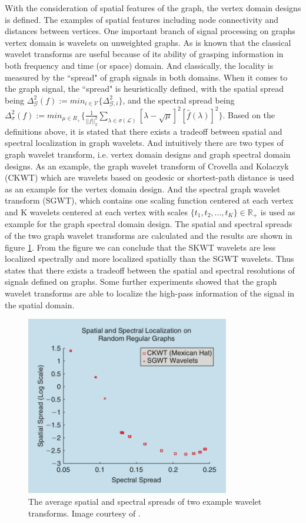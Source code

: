 \documentclass[conference]{IEEEtran}
\begin{document}
With the consideration of spatial features of the graph, the vertex domain designs is defined. The examples of spatial features including node connectivity and distances between vertices. One important branch of signal processing on graphs vertex domain is wavelets on unweighted graphs. As is known that the classical wavelet transforms are useful because of its ability of grasping information in both frequency and time (or space) domain. And classically, the locality is measured by the ``spread" of graph signals in both domains. When it comes to the graph signal, the ``spread" is heuristically defined, with the spatial spread being $\Delta_\mathcal{G}^2(f):=min_{i\in\mathcal{V}}\{\Delta_{\mathcal{G}, i}^2\}$, and the spectral spread being $\Delta_{\sigma}^2(f):=min_{\mu\in R_+}\{\displaystyle\frac{1}{||f||_2^2}\sum_{\lambda\in\sigma (\mathcal{L})}[\lambda-\sqrt{\mu}]^2[\hat{f}(\lambda)]^2\}$. Based on the definitions above, it is stated that there exists a tradeoff between spatial and spectral localization in graph wavelets. And intuitively there are two types of graph wavelet transform, i.e. vertex domain designs and graph spectral domain designs. As an example, the graph wavelet transform of Crovella and Kolaczyk (CKWT) which are wavelets based on geodesic or shortest-path distance is used as an example for the vertex domain design. And the spectral graph wavelet transform (SGWT), which contains one scaling function centered at each vertex and K wavelets centered at each vertex with scales $\{t_1, t_2, ..., t_K\}\in \mathbb{R}_+$ is used as example for the graph spectral domain design. The spatial and spectral spreads of the two graph wavelet transforms are calculated and the results are shown in figure \ref{4}. From the figure we can conclude that the SKWT wavelets are less localized spectrally and more localized spatially than the SGWT wavelets. Thus states that there exists a tradeoff between the spatial and spectral resolutions of signals defined on graphs. Some further experiments showed that the graph wavelet transforms are able to localize the high-pass information of the signal in the spatial domain.\\
\begin{figure}[htbp]
\centerline{\includegraphics[width=3.5in]{4.png}}
\caption{The average spatial and spectral spreads of two example wavelet transforms. Image courtesy of \cite{shuman2013emerging}.}
\label{4}
\end{figure}
\end{document}

